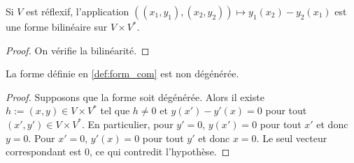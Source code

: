 \begin{definition}
    \label{def:form_com}
    \uses{}
    \leanok 

    Si $V$ est réflexif, l'application $((x_1,y_1),(x_2,y_2))\mapsto y_1(x_2)-y_2(x_1)$ est une forme bilinéaire sur 
    $V\times V^*$.
    \begin{proof}
        \leanok
        On vérifie la bilinéarité.
    \end{proof}
\end{definition}

\begin{proposition}
    \label{def:non_dege_form_com}
    \leanok 

    La forme définie en \ref{def:form_com} est non dégénérée.
    \begin{proof}
        \leanok
        Supposons que la forme soit dégénérée. Alors il existe $h:=(x,y)\in V\times V^*$ tel
        que $h\ne 0$ et $y(x')-y'(x)=0$ pour tout $(x',y')\in V\times V^*$.
        En particulier, pour $y'=0$, $y(x')=0$ pour tout $x'$ et donc $y=0$.
        Pour $x'=0$, $y'(x)=0$ pour tout $y'$ et donc $x=0$.
        Le seul vecteur correspondant est $0$, ce qui contredit l'hypothèse.
    \end{proof}
\end{proposition}
